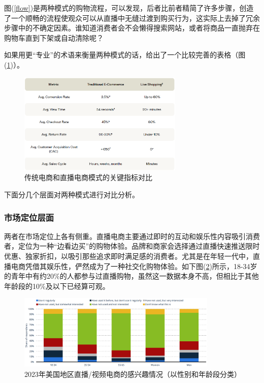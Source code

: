 \documentclass[12pt]{ctexart}
\begin{document}
图(\ref{flow})是两种模式的购物流程，可以发现，后者比前者精简了许多步骤，创造了一个顺畅的流程使观众可以从直播中无缝过渡到购买行为，这实际上去掉了冗余步骤中的不确定因素。谁知道消费者会不会懒得搜索网站，或者将商品一直抛弃在购物车直到下架或自动清除呢？

如果用更“专业”的术语来衡量两种模式的话，\cite{16}给出了一个比较完善的表格（图(\ref{index})）。

\begin{figure}[htbp!]
    \centering
    \includegraphics[width=0.7\textwidth]{Images/11.png}
    \caption{传统电商和直播电商模式的关键指标对比\cite{16}}
    \label{index}
\end{figure}

下面分几个层面对两种模式进行对比分析。

\subsubsection{市场定位层面}
两者在市场定位上各有侧重。直播电商主要通过即时的互动和娱乐性内容吸引消费者，定位为一种“边看边买”的购物体验。品牌和商家会选择通过直播快速推送限时优惠、独家折扣，以吸引那些追求即时满足感的消费者。尤其是在年轻一代中，直播电商凭借其娱乐性，俨然成为了一种社交化购物体验。如下图(\ref{interest_us})所示，18-34岁的青年中有约20\%的人都参与过直播购物，虽然这一数据本身不高，但相比于其他年龄段的10\%及以下已经算可观。

\begin{figure}[htbp!]
    \centering
    \includegraphics[width=0.85\textwidth]{Images/12.png}
    \caption{2023年美国地区直播/视频电商的感兴趣情况（以性别和年龄段分类）\cite{4}}
    \label{interest_us}
\end{figure}
\end{document}
